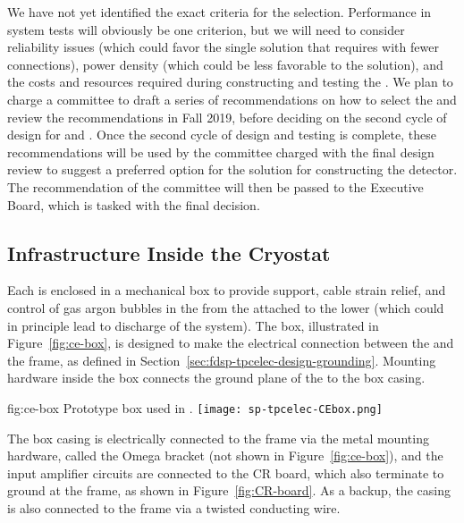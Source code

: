 We have not yet identified the exact criteria for the
 selection. Performance in system tests will obviously
be one criterion, but we will need to consider reliability issues (which could favor the single 
solution that requires  with fewer connections), 
power density (which could be less favorable to the  solution),
and the costs and resources required during constructing
and testing the . We plan to charge a committee
to draft a series of recommendations on how to select the
 and review the recommendations in Fall
2019, before deciding on the second cycle of design for
 and . Once the second cycle of design
and testing is complete, these recommendations will be used by the
committee charged with the final design review to suggest a
preferred option for the  solution for 
constructing the   detector. The recommendation of
the committee will then be passed to the  Executive Board,
which is tasked with the final  decision.

\subsection{Infrastructure Inside the Cryostat}
\label{sec:fdsp-tpcelec-design-infrastructure}

Each  is enclosed in a mechanical  box to provide support, cable strain
relief, and control of gas argon bubbles in the  from the  attached to the lower 
(which could in principle lead to discharge of the  system).
The  box, illustrated in Figure~\ref{fig:ce-box}, is designed to make the electrical connection 
between the  and the  frame, as defined in Section~\ref{sec:fdsp-tpcelec-design-grounding}.
Mounting hardware inside the  box connects the ground plane of the  to the box casing.

\begin{dunefigure}
{fig:ce-box}
{Prototype  box used in .}
\texttt{[image: sp-tpcelec-CEbox.png]}
\end{dunefigure}

The  box casing is electrically connected to the  frame via the metal mounting hardware,
called the Omega bracket (not shown in Figure~\ref{fig:ce-box}), 
and the input amplifier circuits are connected to the CR board, which also terminate to
ground at the  frame, as shown in Figure~\ref{fig:CR-board}.
As a backup, the casing is also connected to the  frame via a twisted conducting wire.

